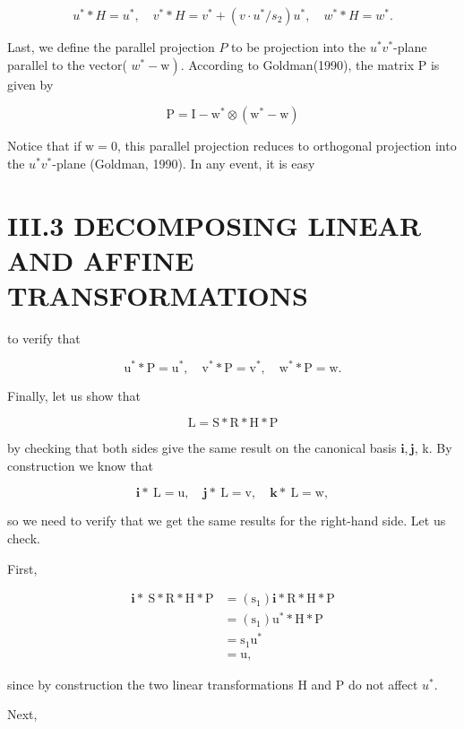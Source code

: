$$
u^{*} * H=u^{*}, \quad v^{*} * H=v^{*}+\left(v \cdot u^{*} / s_{2}\right) u^{*}, \quad w^{*} * H=w^{*} .
$$

Last, we define the parallel projection $P$ to be projection into the $u^{*} v^{*}$-plane parallel to the vector( $\left.w^{*}-\mathrm{w}\right)$. According to Goldman(1990), the matrix $\mathrm{P}$ is given by

$$
\mathrm{P}=\mathrm{I}-\mathrm{w}^{*} \otimes\left(\mathrm{w}^{*}-\mathrm{w}\right)
$$

Notice that if $\mathrm{w}=0$, this parallel projection reduces to orthogonal projection into the $u^{*} v^{*}$-plane (Goldman, 1990). In any event, it is easy

\section{III.3 DECOMPOSING LINEAR AND AFFINE TRANSFORMATIONS}
to verify that

$$
\mathrm{u}^{*} * \mathrm{P}=\mathrm{u}^{*}, \quad \mathrm{v}^{*} * \mathrm{P}=\mathrm{v}^{*}, \quad \mathrm{w}^{*} * \mathrm{P}=\mathrm{w} .
$$

Finally, let us show that

$$
\mathrm{L}=\mathrm{S} * \mathrm{R} * \mathrm{H} * \mathrm{P}
$$

by checking that both sides give the same result on the canonical basis $\mathbf{i}, \mathbf{j}$, k. By construction we know that

$$
\mathbf{i} * \mathrm{~L}=\mathrm{u}, \quad \mathbf{j} * \mathrm{~L}=\mathrm{v}, \quad \mathbf{k} * \mathrm{~L}=\mathrm{w},
$$

so we need to verify that we get the same results for the right-hand side. Let us check.

First,

$$
\begin{aligned}
\mathbf{i} * \mathrm{~S} * \mathrm{R} * \mathrm{H} * \mathrm{P} &=\left(\mathrm{s}_{1}\right) \mathbf{i} * \mathrm{R} * \mathrm{H} * \mathrm{P} \\
&=\left(\mathrm{s}_{1}\right) \mathrm{u}^{*} * \mathrm{H} * \mathrm{P} \\
&=\mathrm{s}_{1} \mathrm{u}^{*} \\
&=\mathrm{u},
\end{aligned}
$$

since by construction the two linear transformations $\mathrm{H}$ and $\mathrm{P}$ do not affect $u^{*}$.

Next,

